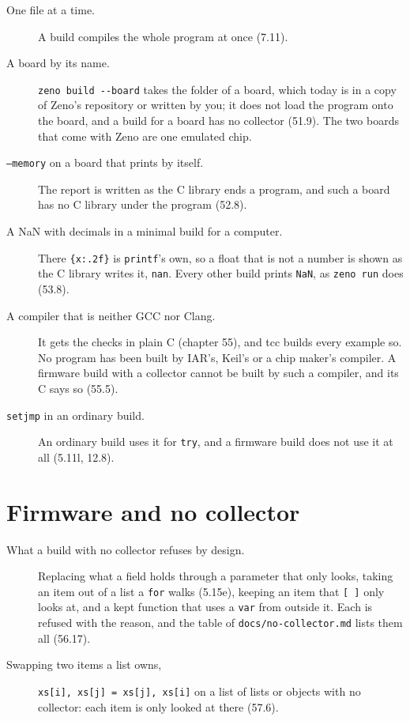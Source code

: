 \begin{description}
\item[One file at a time.] A build compiles the whole program at once
  (7.11).
\item[A board by its name.] \verb|zeno build --board| takes the
  folder of a board, which today is in a copy of Zeno's repository or
  written by you; it does not load the program onto the board, and a
  build for a board has no collector (51.9). The two boards that come
  with Zeno are one emulated chip.
\item[\texttt{--memory} on a board that prints by itself.] The
  report is written as the C library ends a program, and such a board
  has no C library under the program (52.8).
\item[A NaN with decimals in a minimal build for a computer.] There
  \verb|{x:.2f}| is \verb|printf|'s own, so a float that is not a
  number is shown as the C library writes it, \verb|nan|. Every other
  build prints \verb|NaN|, as \verb|zeno run| does (53.8).
\item[A compiler that is neither GCC nor Clang.] It gets the checks
  in plain C (chapter 55), and tcc builds every example so. No program
  has been built by IAR's, Keil's or a chip maker's compiler. A
  firmware build with a collector cannot be built by such a compiler,
  and its C says so (55.5).
\item[\texttt{setjmp} in an ordinary build.] An ordinary build uses it
  for \verb|try|, and a firmware build does not use it at all (5.11l,
  12.8).
\end{description}

\section{Firmware and no collector}

\begin{description}
\item[What a build with no collector refuses by design.] Replacing
  what a field holds through a parameter that only looks, taking an
  item out of a list a \verb|for| walks (5.15e), keeping an item that
  \verb|[ ]| only looks at, and a kept function that uses a \verb|var|
  from outside it. Each is refused with the reason, and the table of
  \verb|docs/no-collector.md| lists them all (56.17).
\item[Swapping two items a list owns,] \verb|xs[i], xs[j] = xs[j], xs[i]|
  on a list of lists or objects with no collector: each item is only
  looked at there (57.6).
\end{description}

